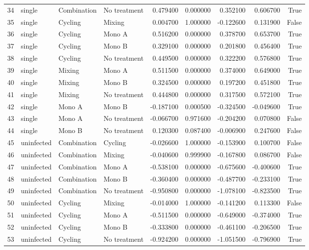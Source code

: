 \begin{tabular}{llllrrrrr}
34 & single & Combination & No treatment & 0.479400 & 0.000000 & 0.352100 & 0.606700 & True \\
35 & single & Cycling & Mixing & 0.004700 & 1.000000 & -0.122600 & 0.131900 & False \\
36 & single & Cycling & Mono A & 0.516200 & 0.000000 & 0.378700 & 0.653700 & True \\
37 & single & Cycling & Mono B & 0.329100 & 0.000000 & 0.201800 & 0.456400 & True \\
38 & single & Cycling & No treatment & 0.449500 & 0.000000 & 0.322200 & 0.576800 & True \\
39 & single & Mixing & Mono A & 0.511500 & 0.000000 & 0.374000 & 0.649000 & True \\
40 & single & Mixing & Mono B & 0.324500 & 0.000000 & 0.197200 & 0.451800 & True \\
41 & single & Mixing & No treatment & 0.444800 & 0.000000 & 0.317500 & 0.572100 & True \\
42 & single & Mono A & Mono B & -0.187100 & 0.000500 & -0.324500 & -0.049600 & True \\
43 & single & Mono A & No treatment & -0.066700 & 0.971600 & -0.204200 & 0.070800 & False \\
44 & single & Mono B & No treatment & 0.120300 & 0.087400 & -0.006900 & 0.247600 & False \\
45 & uninfected & Combination & Cycling & -0.026600 & 1.000000 & -0.153900 & 0.100700 & False \\
46 & uninfected & Combination & Mixing & -0.040600 & 0.999900 & -0.167800 & 0.086700 & False \\
47 & uninfected & Combination & Mono A & -0.538100 & 0.000000 & -0.675600 & -0.400600 & True \\
48 & uninfected & Combination & Mono B & -0.360400 & 0.000000 & -0.487700 & -0.233100 & True \\
49 & uninfected & Combination & No treatment & -0.950800 & 0.000000 & -1.078100 & -0.823500 & True \\
50 & uninfected & Cycling & Mixing & -0.014000 & 1.000000 & -0.141200 & 0.113300 & False \\
51 & uninfected & Cycling & Mono A & -0.511500 & 0.000000 & -0.649000 & -0.374000 & True \\
52 & uninfected & Cycling & Mono B & -0.333800 & 0.000000 & -0.461100 & -0.206500 & True \\
53 & uninfected & Cycling & No treatment & -0.924200 & 0.000000 & -1.051500 & -0.796900 & True \\

\end{tabular}
